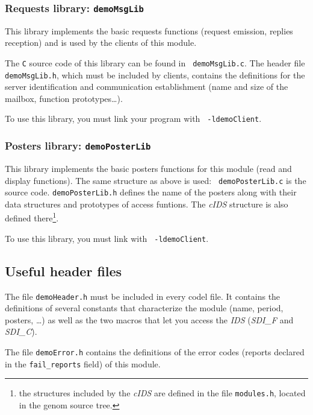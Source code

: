 \subsubsection{Requests library: {\tt demoMsgLib}}

This library implements  the basic requests  functions (request emission,
replies reception) and is used by the clients of this module.

The {\tt   C}  source code    of  this  library  can be   found  in  {\tt
demoMsgLib.c}.  The header
file {\tt demoMsgLib.h}, which must  be included by clients, contains the
definitions for the server identification and communication establishment
(name and size of the mailbox, function prototypes\ldots).

To use this  library, you must link your  program with  {\tt
-ldemoClient}. 


\subsubsection{Posters library: {\tt demoPosterLib}}

This library implements the basic posters functions for this module (read
and display   functions).  The same    structure as above  is used:  {\tt
demoPosterLib.c} is  the  source code. 
{\tt demoPosterLib.h}   defines the name  of  the
posters along  with  their data structures and prototypes of access
funtions.
The  {\em cIDS} structure is
also defined there\footnote{the structures included by the {\em cIDS} are
defined in the file {\tt modules.h}, located in the genom source tree.}.

To  use this library,  you must link  with  {\tt 
-ldemoClient}.


\subsection{Useful header files}

The file {\tt  demoHeader.h} must  be included  in every  codel file.  It
contains the definitions of several constants that characterize the module
(name, period, posters, \ldots)  as well as the two  macros that let  you
access the {\em IDS} ({\em SDI\_F} and {\em SDI\_C}).

The file  {\tt demoError.h} contains the  definitions of the  error codes
(reports declared in the {\tt fail\_reports} field) of this module.

